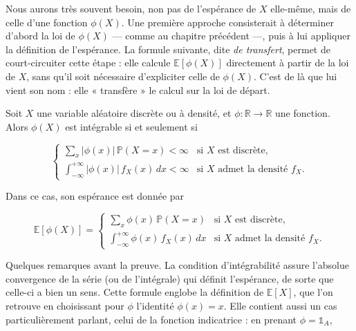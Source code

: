 Nous aurons très souvent besoin, non pas de l'espérance de $X$ elle-même, mais de celle d'une fonction $\phi(X)$. Une première approche consisterait à déterminer d'abord la loi de $\phi(X)$ — comme au chapitre précédent —, puis à lui appliquer la définition de l'espérance. La formule suivante, dite \emph{de transfert}, permet de court-circuiter cette étape : elle calcule $\mathbb{E}[\phi(X)]$ directement à partir de la loi de $X$, sans qu'il soit nécessaire d'expliciter celle de $\phi(X)$. C'est de là que lui vient son nom : elle « transfère » le calcul sur la loi de départ.

\medskip

\begin{mdframed}
\begin{proposition}
Soit $X$ une variable aléatoire discrète ou à densité, et $\phi : \mathbb{R} \to \mathbb{R}$ une fonction. Alors $\phi(X)$ est intégrable si et seulement si

$$
\begin{cases} \displaystyle\sum_x |\phi(x)|\, \mathbb{P}(X = x) < \infty & \text{si } X \text{ est discrète}, \\[8pt] \displaystyle\int_{-\infty}^{+\infty} |\phi(x)|\, f_X(x)\, dx < \infty & \text{si } X \text{ admet la densité } f_X. \end{cases}
$$

Dans ce cas, son espérance est donnée par

\begin{equation}\label{2.1}
\mathbb{E}[\phi(X)] = \begin{cases} \displaystyle\sum_x \phi(x)\, \mathbb{P}(X = x) & \text{si } X \text{ est discrète}, \\[8pt] \displaystyle\int_{-\infty}^{+\infty} \phi(x)\, f_X(x)\, dx & \text{si } X \text{ admet la densité } f_X. \end{cases}
\end{equation}
\end{proposition}
\end{mdframed}

Quelques remarques avant la preuve. La condition d'intégrabilité assure l'absolue convergence de la série (ou de l'intégrale) qui définit l'espérance, de sorte que celle-ci a bien un sens. Cette formule englobe la définition de $\mathbb{E}[X]$, que l'on retrouve en choisissant pour $\phi$ l'identité $\phi(x) = x$. Elle contient aussi un cas particulièrement parlant, celui de la fonction indicatrice : en prenant $\phi = \mathbb{1}_A$,

